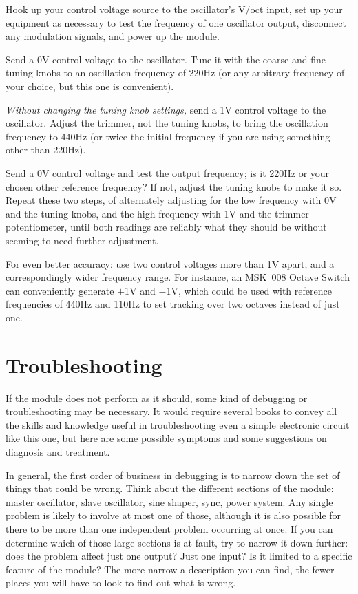 Hook up your control voltage source to the oscillator's V/oct input, set up
your equipment as necessary to test the frequency of one oscillator output,
disconnect any modulation signals, and power up the module.

Send a 0V control voltage to the oscillator.  Tune it with the coarse and
fine tuning knobs to an oscillation frequency of 220Hz (or any arbitrary
frequency of your choice, but this one is convenient).

\emph{Without changing the tuning knob settings,} send a 1V control voltage
to the oscillator.  Adjust the trimmer, not the tuning knobs, to bring the
oscillation frequency to 440Hz (or twice the initial frequency if you are
using something other than 220Hz).

Send a 0V control voltage and test the output frequency; is it 220Hz or your
chosen other reference frequency?  If not, adjust the tuning knobs to make
it so.  Repeat these two steps, of alternately adjusting for the low
frequency with 0V and the tuning knobs, and the high frequency with 1V and
the trimmer potentiometer, until both readings are reliably what they should
be without seeming to need further adjustment.

For even better accuracy:  use two control voltages more than 1V apart, and
a correspondingly wider frequency range.  For instance, an MSK~008 Octave
Switch can conveniently
generate $+$1V and $-$1V, which could be used with reference frequencies of
440Hz and 110Hz to set tracking over two octaves instead of just one.

\section{Troubleshooting}

If the module does not perform as it should, some kind of debugging or
troubleshooting may be necessary.
It would require several books to convey all the skills and knowledge useful
in troubleshooting even a simple electronic circuit like this one, but here
are some possible symptoms and some suggestions on diagnosis and treatment.

In general, the first order of business in debugging is to narrow down the
set of things that could be wrong.  Think about the different sections of
the module:  master oscillator, slave oscillator, sine shaper, sync, power
system.  Any single problem is likely to involve at most one of those,
although it is also possible for there to be more than one independent
problem occurring at once.  If you can determine which of those large
sections is at fault, try to narrow it down further:  does the problem
affect just one output?  Just one input?  Is it limited to a specific
feature of the module?  The more narrow a description you can find, the
fewer places you will have to look to find out what is wrong.

